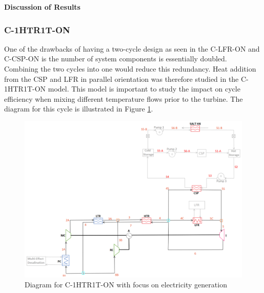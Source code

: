 \begin{paracol}{2}
\textbf{Discussion of Results}

\subsubsection{C-1HTR1T-ON} %

One of the drawbacks of having a two-cycle design as seen in the C-LFR-ON and C-CSP-ON is the number of system components is essentially doubled. Combining the two cycles into one would reduce this redundancy. Heat addition from the CSP and LFR in parallel orientation was therefore studied in the C-1HTR1T-ON model. This model is important to study the impact on cycle efficiency when mixing different temperature flows prior to the turbine. The diagram for this cycle is illustrated in Figure \ref{c-1htr1t-on}.

\end{paracol}
\begin{figure}[H] 
    \widefigure
    \includegraphics[width=\linewidth]{Definitions/c-1htr1t-on.pdf}
    \caption{Diagram for C-1HTR1T-ON with focus on electricity generation\label{c-1htr1t-on}}
\end{figure}
